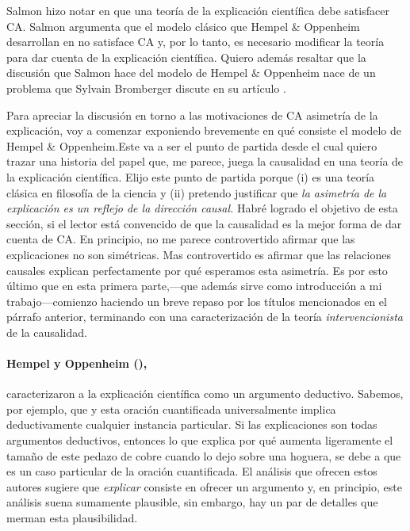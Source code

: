 Salmon hizo notar en  que una teoría
de la explicación científica debe satisfacer CA. Salmon
argumenta que el modelo clásico que Hempel $\&$ Oppenheim
desarrollan en  no satisface CA y, por
lo tanto, es necesario modificar la teoría para dar cuenta
de la explicación científica. Quiero además resaltar que la
discusión que Salmon hace del modelo de Hempel $\&$
Oppenheim nace de un problema que  Sylvain Bromberger
discute en su artículo .

Para apreciar la discusión en torno a las motivaciones de CA
asimetría de la explicación, voy a comenzar exponiendo
brevemente en qué consiste el modelo de Hempel $\&$
Oppenheim.Este va a ser el punto de partida desde el cual
quiero trazar una historia del papel que, me parece, juega
la causalidad en una teoría de la explicación científica.
Elijo este punto de partida porque (i) es una teoría clásica
en filosofía de la ciencia y (ii) pretendo justificar que
\emph{la asimetría de la explicación es un reflejo de la
dirección causal.} Habré logrado el objetivo de esta
sección, si el lector está convencido de que la causalidad
es la mejor forma de dar cuenta de CA. 
En principio, no me parece controvertido afirmar que las
explicaciones no son simétricas. Mas controvertido es
afirmar que las relaciones causales explican perfectamente
por qué esperamos esta asimetría. Es por esto último que
en esta primera parte,---que además sirve como introducción
a mi trabajo---comienzo haciendo un breve repaso por los
títulos mencionados en el párrafo anterior, terminando con
una caracterización de la teoría \emph{intervencionista} de
la causalidad.


\paragraph{Hempel y Oppenheim (\citeyear{Hempel1948}),}
caracterizaron  a la explicación científica como un
argumento deductivo. Sabemos, por ejemplo, que  y esta oración
cuantificada universalmente implica deductivamente cualquier
instancia particular. Si las explicaciones son todas
argumentos deductivos, entonces lo que explica por qué
aumenta ligeramente el tamaño de este pedazo de cobre cuando
lo dejo sobre una hoguera, se debe a que es un caso
particular de la oración cuantificada. El análisis que 
ofrecen estos autores sugiere que \emph{explicar} consiste 
en ofrecer un argumento y, en principio, este análisis suena
sumamente plausible, sin embargo, hay un par de detalles que
merman esta plausibilidad.

